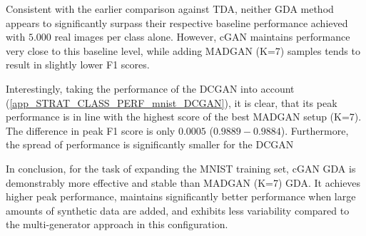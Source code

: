 Consistent with the earlier comparison against TDA, neither GDA method appears to significantly surpass their respective baseline performance achieved with $5.000$ real images per class alone. However, cGAN maintains performance very close to this baseline level, while adding MADGAN (K=7) samples tends to result in slightly lower F1 scores.

Interestingly, taking the performance of the DCGAN into account (\ref{app_STRAT_CLASS_PERF_mnist_DCGAN}), it is clear, that its peak performance is in line with the highest score of the best MADGAN setup (K=7). The difference in peak F1 score is only $0.0005$ ($0.9889 - 0.9884$). Furthermore, the spread of performance is significantly smaller for the DCGAN

In conclusion, for the task of expanding the MNIST training set, cGAN GDA is demonstrably more effective and stable than MADGAN (K=7) GDA. It achieves higher peak performance, maintains significantly better performance when large amounts of synthetic data are added, and exhibits less variability compared to the multi-generator approach in this configuration.

